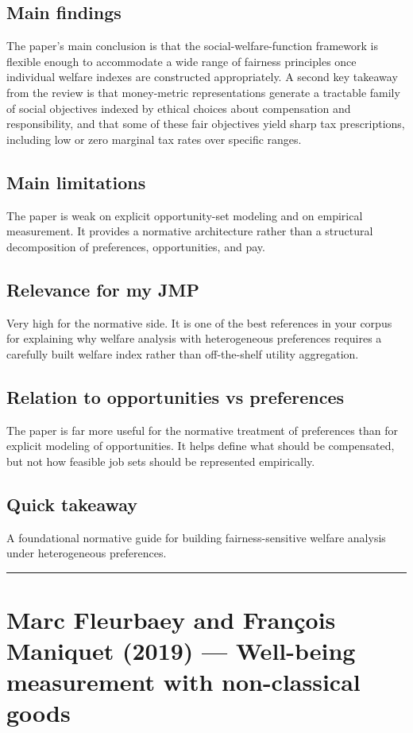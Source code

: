 \documentclass[11pt,a4paper]{article}
\begin{document}
\subsection*{Main findings}
The paper's main conclusion is that the social-welfare-function framework is flexible enough to accommodate a wide range of fairness principles once individual welfare indexes are constructed appropriately. A second key takeaway from the review is that money-metric representations generate a tractable family of social objectives indexed by ethical choices about compensation and responsibility, and that some of these fair objectives yield sharp tax prescriptions, including low or zero marginal tax rates over specific ranges.

\subsection*{Main limitations}
The paper is weak on explicit opportunity-set modeling and on empirical measurement. It provides a normative architecture rather than a structural decomposition of preferences, opportunities, and pay.

\subsection*{Relevance for my JMP}
Very high for the normative side. It is one of the best references in your corpus for explaining why welfare analysis with heterogeneous preferences requires a carefully built welfare index rather than off-the-shelf utility aggregation.

\subsection*{Relation to opportunities vs preferences}
The paper is far more useful for the normative treatment of preferences than for explicit modeling of opportunities. It helps define what should be compensated, but not how feasible job sets should be represented empirically.

\subsection*{Quick takeaway}
A foundational normative guide for building fairness-sensitive welfare analysis under heterogeneous preferences.


\medskip\hrule\medskip

\section*{Marc Fleurbaey and François Maniquet (2019) — Well-being measurement with non-classical goods}
\end{document}
